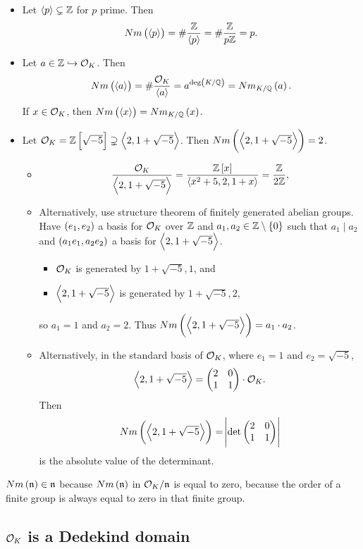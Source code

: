 \begin{example*}
\hfill
\begin{itemize}
\item Let $ \left\langle p \right\rangle \subsetneq \mathbb{Z} $ for $ p $ prime. Then
$$ Nm\br{\abr{p}} = \#\dfrac{\Z}{\abr{p}} = \#\dfrac{\Z}{p\Z} = p. $$
\item Let $ a \in \mathbb{Z} \hookrightarrow \mathcal{O}_K $. Then
$$ Nm\br{\abr{a}} = \#\dfrac{\OO_K}{\abr{a}} = a^{\deg\br{K / \Q}} = Nm_{K / \Q}\br{a}. $$
If $ x \in \mathcal{O}_K $, then $ Nm\br{\abr{x}} = Nm_{K / \Q}\br{x} $.
\item Let $ \OO_K = \Z\sbr{\sqrt{-5}} \supsetneq \abr{2, 1 + \sqrt{-5}} $. Then $ Nm\br{\abr{2, 1 + \sqrt{-5}}} = 2 $.
\begin{itemize}
\item
$$ \dfrac{\OO_K}{\abr{2, 1 + \sqrt{-5}}} = \dfrac{\Z\sbr{x}}{\abr{x^2 + 5, 2, 1 + x}} = \dfrac{\Z}{2\Z}, $$
\item Alternatively, use structure theorem of finitely generated abelian groups. Have $ \br{e_1, e_2} $ a basis for $ \mathcal{O}_K $ over $ \mathbb{Z} $ and $ a_1, a_2 \in \Z \setminus \cbr{0} $ such that $ a_1 \mid a_2 $ and $ \br{a_1e_1, a_2e_2} $ a basis for $ \left\langle 2, 1 + \sqrt{-5} \right\rangle $.
\begin{itemize}
\item $ \mathcal{O}_K $ is generated by $ 1 + \sqrt{-5}, 1 $, and
\item $ \left\langle 2, 1 + \sqrt{-5} \right\rangle $ is generated by $ 1 + \sqrt{-5}, 2 $,
\end{itemize}
so $ a_1 = 1 $ and $ a_2 = 2 $. Thus $ Nm\br{\abr{2, 1 + \sqrt{-5}}} = a_1 \cdot a_2 $.
\item Alternatively, in the standard basis of $ \mathcal{O}_K $, where $ e_1 = 1 $ and $ e_2 = \sqrt{-5} $,
$$ \left\langle 2, 1 + \sqrt{-5} \right\rangle = \begin{pmatrix} 2 & 0 \\ 1 & 1 \end{pmatrix} \cdot \mathcal{O}_K. $$
Then
$$ Nm\br{\abr{2, 1 + \sqrt{-5}}} = \abs{\det\twobytwo{2}{0}{1}{1}} $$
is the absolute value of the determinant.
\end{itemize}
\end{itemize}
\end{example*}


\begin{remark*}
$ Nm\br{\nn} \in \nn $ because $ Nm\br{\nn} $ in $ \mathcal{O}_K / \mathfrak{n} $ is equal to zero, because the order of a finite group is always equal to zero in that finite group.
\end{remark*}

\subsection{$ \mathcal{O}_K $ is a Dedekind domain}

